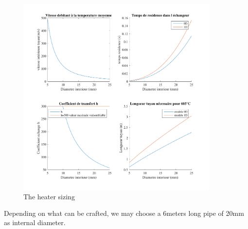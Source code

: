 \begin{figure}[!h]
  \centering
\includegraphics[width=0.9\textwidth]{fig/dimensionnement_rechauffeur.pdf}
  \caption{The heater sizing}
 \label{heater_sizing}
\end{figure}

Depending on what can be crafted, we may choose a 6meters long pipe of 20mm as internal diameter.
